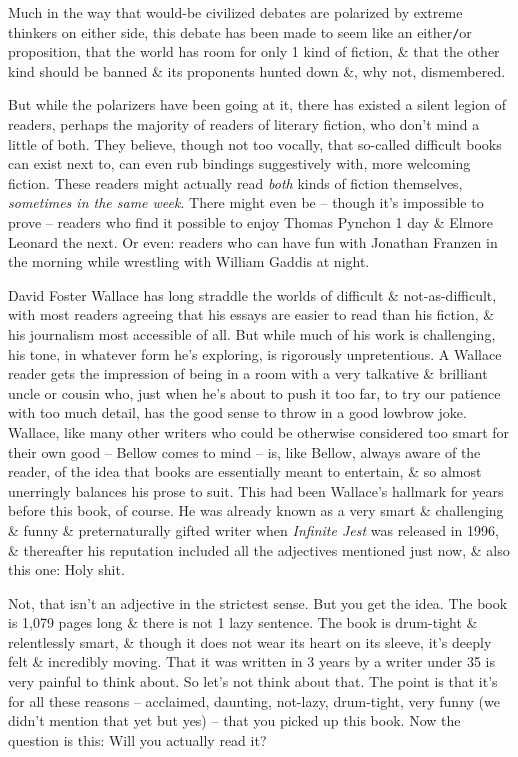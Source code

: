 \documentclass{article}
\numberwithin{equation}{section}
\begin{document}
Much in the way that would-be civilized debates are polarized by extreme thinkers on either side, this debate has been made to seem like an either{\tt/}or proposition, that the world has room for only 1 kind of fiction, \& that the other kind should be banned \& its proponents hunted down \&, why not, dismembered.

But while the polarizers have been going at it, there has existed a silent legion of readers, perhaps the majority of readers of literary fiction, who don't mind a little of both. They believe, though not too vocally, that so-called difficult books can exist next to, can even rub bindings suggestively with, more welcoming fiction. These readers might actually read \textit{both} kinds of fiction themselves, \textit{sometimes in the same week}. There might even be -- though it's impossible to prove -- readers who find it possible to enjoy Thomas Pynchon 1 day \& Elmore Leonard the next. Or even: readers who can have fun with Jonathan Franzen in the morning while wrestling with William Gaddis at night.

David Foster Wallace has long straddle the worlds of difficult \& not-as-difficult, with most readers agreeing that his essays are easier to read than his fiction, \& his journalism most accessible of all. But while much of his work is challenging, his tone, in whatever form he's exploring, is rigorously unpretentious. A Wallace reader gets the impression of being in a room with a very talkative \& brilliant uncle or cousin who, just when he's about to push it too far, to try our patience with too much detail, has the good sense to throw in a good lowbrow joke. Wallace, like many other writers who could be otherwise considered too smart for their own good -- Bellow comes to mind -- is, like Bellow, always aware of the reader, of the idea that books are essentially meant to entertain, \& so almost unerringly balances his prose to suit. This had been Wallace's hallmark for years before this book, of course. He was already known as a very smart \& challenging \& funny \& preternaturally gifted writer when \textit{Infinite Jest} was released in 1996, \& thereafter his reputation included all the adjectives mentioned just now, \& also this one: Holy shit.

Not, that isn't an adjective in the strictest sense. But you get the idea. The book is 1,079 pages long \& there is not 1 lazy sentence. The book is drum-tight \& relentlessly smart, \& though it does not wear its heart on its sleeve, it's deeply felt \& incredibly moving. That it was written in 3 years by a writer under 35 is very painful to think about. So let's not think about that. The point is that it's for all these reasons -- acclaimed, daunting, not-lazy, drum-tight, very funny (we didn't mention that yet but yes) -- that you picked up this book. Now the question is this: Will you actually read it?
\end{document}

